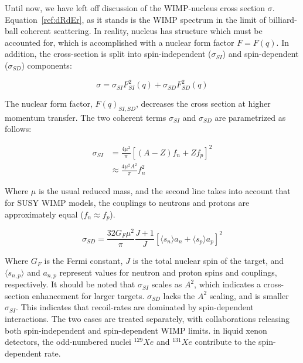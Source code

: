 Until now, we have left off discussion of the \ac{WIMP}-nucleus cross section $\sigma$. Equation~\ref{ref:dRdEr}, as it stands is the \ac{WIMP} spectrum in the limit of billiard-ball coherent scattering. In reality, nucleus has structure which must be accounted for, which is accomplished with a nuclear form factor $F = F(q)$. In addition, the cross-section is split into spin-independent ($\sigma_{SI}$) and spin-dependent ($\sigma_{SD}$) components:

\begin{equation}
\sigma = \sigma_{SI}F^{2}_{SI}(q) + \sigma_{SD}F^{2}_{SD}(q)
\end{equation}

The nuclear form factor, $F(q)_{SI, SD}$, decreases the cross section at higher momentum transfer. The two coherent terms $\sigma_{SI}$ and  $\sigma_{SD}$ are parametrized as follows:

\begin{equation}
\begin{split}
\sigma_{SI} &= \frac{4 \mu^{2} }{\pi} [ (A-Z) f_{n} + Zf_{p}]^{2} \\
 & \approx \frac{4 \mu^{2} A^{2}}{\pi} f_{n}^{2}
\end{split}
\end{equation}

Where $\mu$ is the usual reduced mass, and the second line takes into account that for \ac{SUSY} \ac{WIMP} models, the couplings to neutrons and protons are approximately equal ($f_{n} \approx f_{p}$).

\begin{equation}
\sigma_{SD} = \frac{32 G_{F} \mu^{2}}{\pi} \frac{J+1}{J} [\langle s_{n} \rangle a_{n} + \langle s_{p} \rangle a_{p}] ^{2}
\end{equation}

Where $G_{F}$ is the Fermi constant, $J$ is the total nuclear spin of the target, and $\langle s_{n,p} \rangle$ and $a_{n,p}$ represent values for neutron and proton spins and couplings, respectively. It should be noted that $\sigma_{SI}$ scales as $A^{2}$, which indicates a cross-section enhancement for larger targets. $\sigma_{SD}$ lacks the $A^{2}$ scaling, and is smaller $\sigma_{SI}$. This indicates that recoil-rates are dominated by spin-dependent interactions. The two cases are treated separately, with collaborations releasing both spin-independent and spin-dependent \ac{WIMP} limits. in liquid xenon detectors, the odd-numbered nuclei $^{129}Xe$ and $^{131}Xe$ contribute to the spin-dependent rate. 


